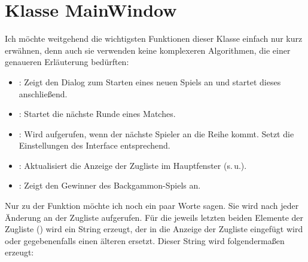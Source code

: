 \section{Klasse MainWindow}
Ich möchte weitgehend die wichtigsten Funktionen dieser Klasse einfach nur kurz erwähnen, denn auch sie verwenden keine komplexeren Algorithmen, die einer genaueren Erläuterung bedürften:
\begin{itemize}
  \item {}: Zeigt den Dialog zum Starten eines neuen Spiels an und startet dieses anschließend.
  \item {}: Startet die nächste Runde eines Matches.
  \item {}: Wird aufgerufen, wenn der nächste Spieler an die Reihe kommt. Setzt die Einstellungen des Interface entsprechend.
  \item {}: Aktualisiert die Anzeige der Zugliste im Hauptfenster (s.\,u.).
  \item {}: Zeigt den Gewinner des Backgammon-Spiels an.
\end{itemize}
Nur zu der Funktion  möchte ich noch ein paar Worte sagen. Sie wird nach jeder Änderung an der Zugliste aufgerufen. Für die jeweils letzten beiden Elemente der Zugliste () wird ein String erzeugt, der in die Anzeige der Zugliste eingefügt wird oder gegebenenfalls einen älteren ersetzt. Dieser String wird folgendermaßen erzeugt:
